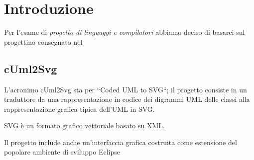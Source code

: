 \chapter{Introduzione}

Per l'esame di \emph{progetto di linguaggi e compilatori} abbiamo deciso di
basarci sul progettino consegnato nel  


\section{cUml2Svg} 
L'acronimo cUml2Svg sta per ``Coded UML to SVG``; 
il progetto consiste in un traduttore da una rappresentazione
in codice dei digrammi UML delle classi alla rappresentazione grafica
tipica dell'UML in SVG.

SVG è un formato grafico vettoriale basato su XML.

Il progetto include anche un'interfaccia grafica costruita come estensione del
popolare ambiente di sviluppo Eclipse~\cite{eclipse_website}

